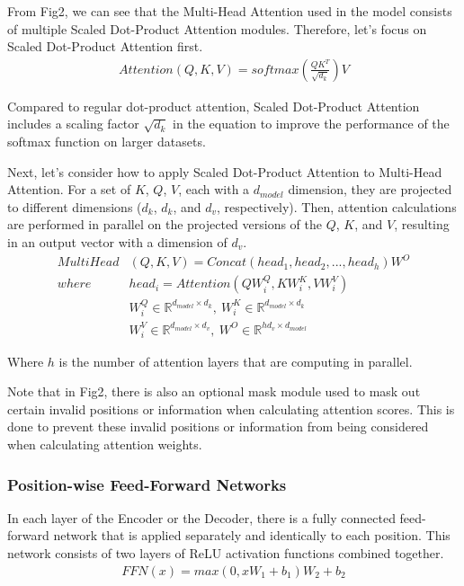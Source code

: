 \documentclass{IEEEtran}
\begin{document}
\par From Fig2, we can see that the Multi-Head Attention used in the model consists of 
multiple Scaled Dot-Product Attention modules. Therefore, let's focus on 
Scaled Dot-Product Attention first.
\begin{align*}
    Attention(Q, K, V) = softmax(\frac{QK^T}{\sqrt{d_k}})V
\end{align*}

\par Compared to regular dot-product attention, Scaled Dot-Product Attention includes a 
scaling factor $\sqrt{d_k}$ in the equation to improve the performance of the softmax 
function on larger datasets.

\par Next, let's consider how to apply Scaled Dot-Product Attention to Multi-Head Attention. 
For a set of $K$, $Q$, $V$, each with a $d_{model}$ dimension, they are projected to different 
dimensions ($d_k$, $d_k$, and $d_v$, respectively). Then, attention calculations are 
performed in parallel on the projected versions of the $Q$, $K$, and $V$, 
resulting in an output vector with a dimension of $d_v$.
\begin{align*}
    MultiHead&(Q, K, V) = Concat(head_1, head_2, ... , head_h)W^O \\
    where \  &head_i = Attention(QW^Q_i, KW^K_i, VW^V_i)\\
    &W^Q_i \in \mathbb{R}^{d_{model}\times d_k}, \  
    W^K_i \in \mathbb{R}^{d_{model}\times d_k}\\
    &W^V_i \in \mathbb{R}^{d_{model}\times d_v}, \ 
    W^O \in \mathbb{R}^{hd_v \times d_{model}}
\end{align*}

\par Where $h$ is the number of attention layers that are computing in parallel.

\par Note that in Fig2, there is also an optional mask module used to mask out certain 
invalid positions or information when calculating attention scores. This is done 
to prevent these invalid positions or information from being considered when calculating 
attention weights.

\subsubsection{Position-wise Feed-Forward Networks}

\par In each layer of the Encoder or the Decoder, there is a fully connected feed-forward 
network that is applied  separately and identically to each position. This network consists of 
two layers of ReLU activation functions combined together.
\begin{align*}
    FFN(x) = max(0, xW_1 + b_1)W_2 + b_2
\end{align*}
\end{document}
